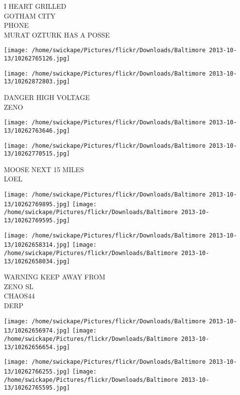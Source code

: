 \documentclass[10pt,letterpaper]{article}
\begin{document}
I HEART GRILLED\\
GOTHAM CITY\\
PHONE\\
MURAT OZTURK HAS A POSSE\\
\pagebreak

\texttt{[image: /home/swickape/Pictures/flickr/Downloads/Baltimore 2013-10-13/10262765126.jpg]}

\vspace{0.25in}
\texttt{[image: /home/swickape/Pictures/flickr/Downloads/Baltimore 2013-10-13/10262872803.jpg]}

DANGER HIGH VOLTAGE\\
ZENO\\
\pagebreak

\texttt{[image: /home/swickape/Pictures/flickr/Downloads/Baltimore 2013-10-13/10262763646.jpg]}

\vspace{0.25in}
\texttt{[image: /home/swickape/Pictures/flickr/Downloads/Baltimore 2013-10-13/10262770515.jpg]}

MOOSE NEXT 15 MILES\\
LOEL\\
\pagebreak

\texttt{[image: /home/swickape/Pictures/flickr/Downloads/Baltimore 2013-10-13/10262769895.jpg]}
\texttt{[image: /home/swickape/Pictures/flickr/Downloads/Baltimore 2013-10-13/10262769595.jpg]}

\texttt{[image: /home/swickape/Pictures/flickr/Downloads/Baltimore 2013-10-13/10262658314.jpg]}
\texttt{[image: /home/swickape/Pictures/flickr/Downloads/Baltimore 2013-10-13/10262658034.jpg]}

WARNING KEEP AWAY FROM\\
ZENO SL\\
CHAOS44\\
DERP\\
\pagebreak

\texttt{[image: /home/swickape/Pictures/flickr/Downloads/Baltimore 2013-10-13/10262656974.jpg]}
\texttt{[image: /home/swickape/Pictures/flickr/Downloads/Baltimore 2013-10-13/10262656654.jpg]}

\texttt{[image: /home/swickape/Pictures/flickr/Downloads/Baltimore 2013-10-13/10262766255.jpg]}
\texttt{[image: /home/swickape/Pictures/flickr/Downloads/Baltimore 2013-10-13/10262765595.jpg]}
\end{document}
